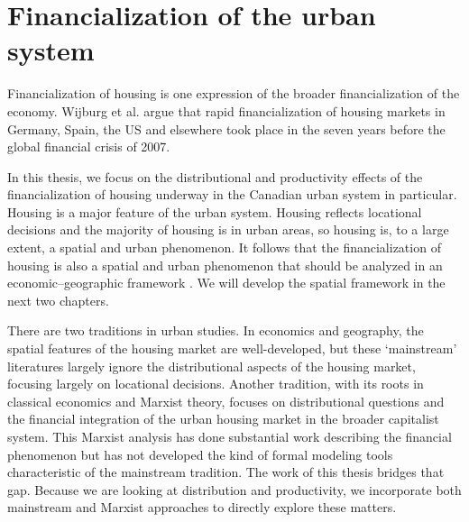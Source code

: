 \section{Financialization of the urban system }



Financialization of housing %
is one expression of the broader financialization of the economy. Wijburg et al. \cite{wijburgFinancialisationRentalHousing2018} argue that rapid financialization of housing markets in Germany, Spain, the US and elsewhere took place in the seven years before the global financial crisis of 2007. 

In this thesis, we focus on the distributional and productivity effects of the financialization of housing underway in the Canadian urban system in particular. Housing is a major feature of the urban system.  Housing reflects locational decisions and the majority of housing is in urban areas, so housing is, to a large extent, a spatial and urban phenomenon. It follows that the financialization of housing is also a spatial and urban phenomenon that should be analyzed in an economic–geographic framework \cite{aalbersPotentialFinancialization2015}. We will develop the spatial framework in the next two chapters. 

There are two traditions in urban studies. In economics and geography, the spatial features of the housing market are well-developed, but these `mainstream' literatures largely ignore the distributional aspects of the housing market, focusing largely on locational decisions. Another tradition, with its roots in \Gls{classical economics} and Marxist theory, focuses on distributional questions and the financial integration of the urban housing market in the broader capitalist system.  This Marxist analysis has done substantial work describing the financial phenomenon but has not developed the kind of formal modeling tools characteristic of the mainstream tradition.   The work of this thesis bridges that gap. Because we are looking at distribution and productivity, we incorporate both mainstream and Marxist approaches to directly explore these matters.


